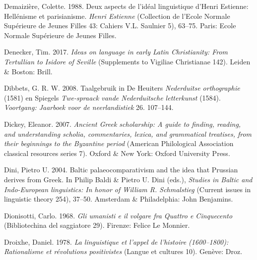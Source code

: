 \begin{styleStandard}
Demaizière, Colette. 1988. Deux aspects de l’idéal linguistique d’Henri Estienne: Hellénisme et parisianisme. \textit{Henri Estienne} (Collection de l’Ecole Normale Supérieure de Jeunes Filles 43: Cahiers V.L. Saulnier 5), 63–75. Paris: Ecole Normale Supérieure de Jeunes Filles.
\end{styleStandard}

\begin{styleStandard}
Denecker, Tim. 2017. \textit{Ideas on language in early Latin Christianity: From Tertullian to Isidore of Seville} (Supplements to Vigiliae Christianae 142). Leiden \& Boston: Brill.
\end{styleStandard}

\begin{styleStandard}
Dibbets, G. R. W. 2008. Taalgebruik in De Heuiters \textit{Nederduitse orthographie} (1581) en Spiegels \textit{Twe-spraack vande Nederduitsche letterkunst} (1584). \textit{Voortgang: Jaarboek voor de neerlandistiek} 26. 107–144.
\end{styleStandard}

\begin{styleStandard}
Dickey, Eleanor. 2007. \textit{Ancient Greek scholarship: A guide to finding, reading, and understanding scholia, commentaries, lexica, and grammatical treatises, from their beginnings to the Byzantine period} (American Philological Association classical resources series 7). Oxford \& New York: Oxford University Press.
\end{styleStandard}

\begin{styleStandard}
Dini, Pietro U. 2004. Baltic palaeocomparativism and the idea that Prussian derives from Greek. In Philip Baldi \& Pietro U. Dini (eds.), \textit{Studies in Baltic and Indo-European linguistics: In honor of William R. Schmalstieg} (Current issues in linguistic theory 254), 37–50. Amsterdam \& Philadelphia: John Benjamins.
\end{styleStandard}

\begin{styleStandard}
Dionisotti, Carlo. 1968. \textit{Gli umanisti e il volgare fra Quattro e Cinquecento} (Bibliotechina del saggiatore 29). Firenze: Felice Le Monnier.
\end{styleStandard}

\begin{styleStandard}
Droixhe, Daniel. 1978. \textit{La linguistique et l’appel de l’histoire (1600–1800): Rationalisme et révolutions positivistes} (Langue et cultures 10). Genève: Droz.
\end{styleStandard}

